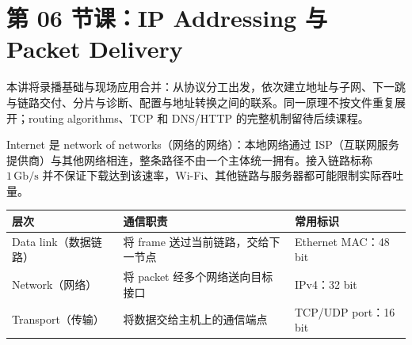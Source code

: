 \begingroup
\renewcommand{\recordid}[1]{}
\renewcommand{\relatedexercise}[2]{\hyperref[exercise:#1]{#2}}

\section{第 06 节课：IP Addressing 与 Packet Delivery}
\label{lecture:SC2008-L06}


本讲将录播基础与现场应用合并：从协议分工出发，依次建立地址与子网、下一跳与链路交付、分片与诊断、配置与地址转换之间的联系。同一原理不按文件重复展开；routing algorithms、TCP 和 DNS/HTTP 的完整机制留待后续课程。


Internet 是 network of networks（网络的网络）：本地网络通过 ISP（互联网服务提供商）与其他网络相连，整条路径不由一个主体统一拥有。接入链路标称 $1\,\mathrm{Gb/s}$ 并不保证下载达到该速率，Wi-Fi、其他链路与服务器都可能限制实际吞吐量。

\begin{center}
\small
\begin{tabularx}{\textwidth}{@{}lXl@{}}
\toprule
层次 & 通信职责 & 常用标识 \\
\midrule
Data link（数据链路） & 将 frame 送过当前链路，交给下一节点 & Ethernet MAC：48 bit \\
Network（网络） & 将 packet 经多个网络送向目标接口 & IPv4：32 bit \\
Transport（传输） & 将数据交给主机上的通信端点 & TCP/UDP port：16 bit \\
\bottomrule
\end{tabularx}
\end{center}

